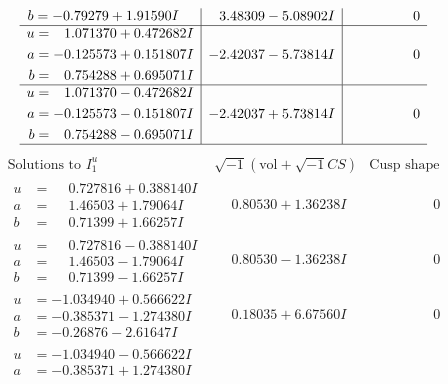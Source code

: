 \documentclass[1p]{elsarticle_modified}
\theoremstyle{definition}
\newcommand{\I}{\sqrt{-1}}
\begin{document}
$$\begin{array}{c|c|c}
\begin{aligned}
b &= -0.79279 + 1.91590 I\end{aligned}
 & \phantom{-}3.48309 - 5.08902 I & \phantom{-0.000000 } 0 \\ \hline\begin{aligned}
u &= \phantom{-}1.071370 + 0.472682 I \\
a &= -0.125573 + 0.151807 I \\
b &= \phantom{-}0.754288 + 0.695071 I\end{aligned}
 & -2.42037 - 5.73814 I & \phantom{-0.000000 } 0 \\ \hline\begin{aligned}
u &= \phantom{-}1.071370 - 0.472682 I \\
a &= -0.125573 - 0.151807 I \\
b &= \phantom{-}0.754288 - 0.695071 I\end{aligned}
 & -2.42037 + 5.73814 I & \phantom{-0.000000 } 0\\
 \hline 
 \end{array}$$\newpage$$\begin{array}{c|c|c}  
\text{Solutions to }I^u_{1}& \I (\text{vol} + \sqrt{-1}CS) & \text{Cusp shape}\\
 \hline 
\begin{aligned}
u &= \phantom{-}0.727816 + 0.388140 I \\
a &= \phantom{-}1.46503 + 1.79064 I \\
b &= \phantom{-}0.71399 + 1.66257 I\end{aligned}
 & \phantom{-}0.80530 + 1.36238 I & \phantom{-0.000000 } 0 \\ \hline\begin{aligned}
u &= \phantom{-}0.727816 - 0.388140 I \\
a &= \phantom{-}1.46503 - 1.79064 I \\
b &= \phantom{-}0.71399 - 1.66257 I\end{aligned}
 & \phantom{-}0.80530 - 1.36238 I & \phantom{-0.000000 } 0 \\ \hline\begin{aligned}
u &= -1.034940 + 0.566622 I \\
a &= -0.385371 - 1.274380 I \\
b &= -0.26876 - 2.61647 I\end{aligned}
 & \phantom{-}0.18035 + 6.67560 I & \phantom{-0.000000 } 0 \\ \hline\begin{aligned}
u &= -1.034940 - 0.566622 I \\
a &= -0.385371 + 1.274380 I \\

\end{aligned}
\end{array}$$
\end{document}

